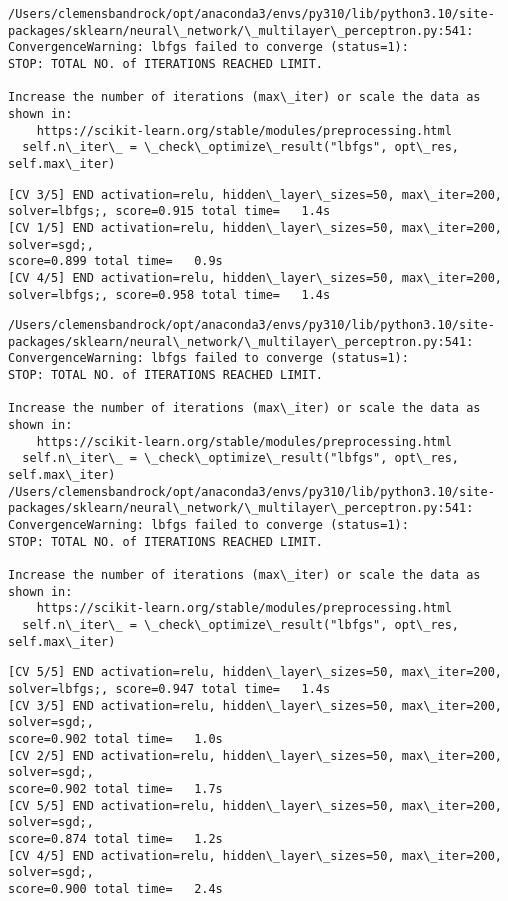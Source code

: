 \documentclass[11pt]{article}
\begin{document}
    \begin{Verbatim}[commandchars=\\\{\}]
/Users/clemensbandrock/opt/anaconda3/envs/py310/lib/python3.10/site-
packages/sklearn/neural\_network/\_multilayer\_perceptron.py:541:
ConvergenceWarning: lbfgs failed to converge (status=1):
STOP: TOTAL NO. of ITERATIONS REACHED LIMIT.

Increase the number of iterations (max\_iter) or scale the data as shown in:
    https://scikit-learn.org/stable/modules/preprocessing.html
  self.n\_iter\_ = \_check\_optimize\_result("lbfgs", opt\_res, self.max\_iter)
    \end{Verbatim}

    \begin{Verbatim}[commandchars=\\\{\}]
[CV 3/5] END activation=relu, hidden\_layer\_sizes=50, max\_iter=200,
solver=lbfgs;, score=0.915 total time=   1.4s
[CV 1/5] END activation=relu, hidden\_layer\_sizes=50, max\_iter=200, solver=sgd;,
score=0.899 total time=   0.9s
[CV 4/5] END activation=relu, hidden\_layer\_sizes=50, max\_iter=200,
solver=lbfgs;, score=0.958 total time=   1.4s
    \end{Verbatim}

    \begin{Verbatim}[commandchars=\\\{\}]
/Users/clemensbandrock/opt/anaconda3/envs/py310/lib/python3.10/site-
packages/sklearn/neural\_network/\_multilayer\_perceptron.py:541:
ConvergenceWarning: lbfgs failed to converge (status=1):
STOP: TOTAL NO. of ITERATIONS REACHED LIMIT.

Increase the number of iterations (max\_iter) or scale the data as shown in:
    https://scikit-learn.org/stable/modules/preprocessing.html
  self.n\_iter\_ = \_check\_optimize\_result("lbfgs", opt\_res, self.max\_iter)
/Users/clemensbandrock/opt/anaconda3/envs/py310/lib/python3.10/site-
packages/sklearn/neural\_network/\_multilayer\_perceptron.py:541:
ConvergenceWarning: lbfgs failed to converge (status=1):
STOP: TOTAL NO. of ITERATIONS REACHED LIMIT.

Increase the number of iterations (max\_iter) or scale the data as shown in:
    https://scikit-learn.org/stable/modules/preprocessing.html
  self.n\_iter\_ = \_check\_optimize\_result("lbfgs", opt\_res, self.max\_iter)
    \end{Verbatim}

    \begin{Verbatim}[commandchars=\\\{\}]
[CV 5/5] END activation=relu, hidden\_layer\_sizes=50, max\_iter=200,
solver=lbfgs;, score=0.947 total time=   1.4s
[CV 3/5] END activation=relu, hidden\_layer\_sizes=50, max\_iter=200, solver=sgd;,
score=0.902 total time=   1.0s
[CV 2/5] END activation=relu, hidden\_layer\_sizes=50, max\_iter=200, solver=sgd;,
score=0.902 total time=   1.7s
[CV 5/5] END activation=relu, hidden\_layer\_sizes=50, max\_iter=200, solver=sgd;,
score=0.874 total time=   1.2s
[CV 4/5] END activation=relu, hidden\_layer\_sizes=50, max\_iter=200, solver=sgd;,
score=0.900 total time=   2.4s
    \end{Verbatim}
\end{document}
